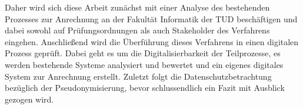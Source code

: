 Daher wird sich diese Arbeit zunächst mit einer Analyse des bestehenden Prozesses zur Anrechnung an der Fakultät Informatik der TUD beschäftigen und dabei sowohl auf Prüfungsordnungen als auch Stakeholder des Verfahrens eingehen. Anschließend wird die Überführung dieses Verfahrens in einen digitalen Prozess geprüft. Dabei geht es um die Digitalisierbarkeit der Teilprozesse, es werden bestehende Systeme analysiert und bewertet und ein eigenes digitales System zur Anrechnung erstellt. Zuletzt folgt die Datenschutzbetrachtung bezüglich der Pseudonymisierung, bevor schlussendlich ein Fazit mit Ausblick gezogen wird.
